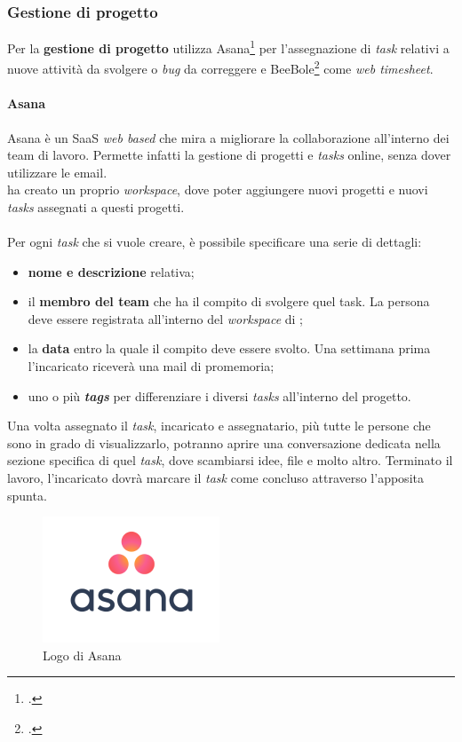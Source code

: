 \subsubsection{Gestione di progetto}
Per la \textbf{gestione di progetto} \azienda{} utilizza Asana\footcite{asana} per l'assegnazione di \emph{task} relativi a nuove attività da svolgere o \emph{bug} da correggere e BeeBole\footcite{beebole} come \emph{web timesheet}.
\paragraph{Asana}
Asana è un \gls{SaaS} \emph{web based} che mira a migliorare la collaborazione all'interno dei team di lavoro. Permette infatti la gestione di progetti e \emph{tasks} online, senza dover utilizzare le email.\\
\azienda{} ha creato un proprio \emph{workspace}, dove poter aggiungere nuovi progetti e nuovi \emph{tasks} assegnati a questi progetti. \\ \\
Per ogni \emph{task} che si vuole creare, è possibile specificare una serie di dettagli:
\begin{itemize}
	\item \textbf{nome e descrizione} relativa;
	\item il \textbf{membro del team} che ha il compito di svolgere quel task. La persona deve essere registrata all'interno del \emph{workspace} di \azienda;
	\item la \textbf{data} entro la quale il compito deve essere svolto. Una settimana prima l'incaricato riceverà una mail di promemoria;
	\item uno o più \textbf{\emph{tags}} per differenziare i diversi \emph{tasks} all'interno del progetto.
\end{itemize}
Una volta assegnato il \emph{task}, incaricato e assegnatario, più tutte le persone che sono in grado di visualizzarlo, potranno aprire una conversazione dedicata nella sezione specifica di quel \emph{task}, dove scambiarsi idee, file e molto altro. Terminato il lavoro, l'incaricato dovrà marcare il \emph{task} come concluso attraverso l'apposita spunta.
\\ 
\begin{figure}[h]
	\centering
	\includegraphics[scale=0.8]{../Immagini/asana.png}
	\caption{Logo di Asana}
\end{figure}

